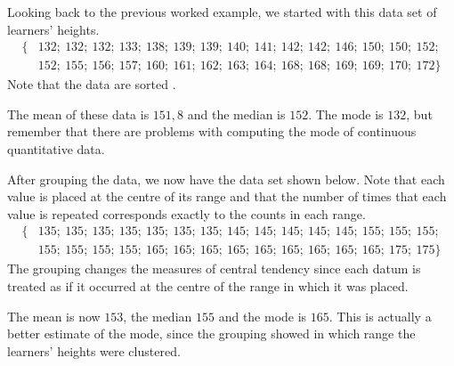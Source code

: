 Looking back to the previous worked example, we started with this data
set of learners' heights.
\begin{align*}
  \{&132;\ 132;\ 132;\ 133;\ 138;\ 139;\ 139;\ 140;\ 141;\ 142;\ 142;\ 146;\ 150;\ 150;\ 152;\\
    &152;\ 155;\ 156;\ 157;\ 160;\ 161;\ 162;\ 163;\ 164;\ 168;\ 168;\ 169;\ 169;\ 170;\ 172\}
\end{align*}
Note that the data are sorted .

The mean of these data is $151,8$ and the median is $152$. The mode is
$132$, but remember that there are problems with computing the mode of
continuous quantitative data.\par

After grouping the data, we now have the data set shown below. Note
that each value is placed at the centre of its range and that the
number of times that each value is repeated corresponds exactly to the
counts in each range.
\begin{align*}
  \{&135;\ 135;\ 135;\ 135;\ 135;\ 135;\ 135;\ 145;\ 145;\ 145;\ 145;\ 145;\ 155;\ 155;\ 155;\\
    &155;\ 155;\ 155;\ 155;\ 165;\ 165;\ 165;\ 165;\ 165;\ 165;\ 165;\ 165;\ 165;\ 175;\ 175\}
\end{align*}
The grouping changes the measures of central tendency since each datum
is treated as if it occurred at the centre of the range in which it was
placed.\par

The mean is now $153$, the median $155$ and the mode is $165$. This is
actually a better estimate of the mode, since the grouping showed in
which range the learners' heights were clustered.


